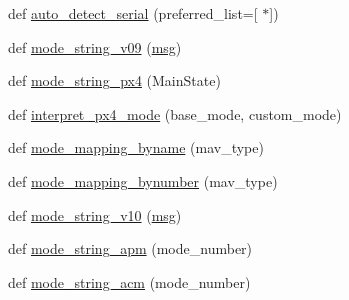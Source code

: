 \begin{DoxyCompactItemize}
\item 
def \mbox{\hyperlink{namespacepymavlink_1_1mavutil_a256e344d1870c0a938cac5b21d3003be}{auto\+\_\+detect\+\_\+serial}} (preferred\+\_\+list=\mbox{[}\textquotesingle{} $\ast$\textquotesingle{}\mbox{]})
\item 
def \mbox{\hyperlink{namespacepymavlink_1_1mavutil_a783db06982d9f522333a924ab479771b}{mode\+\_\+string\+\_\+v09}} (\mbox{\hyperlink{stratnode_8cpp_a82cfe4ed9bc9e1b07c8bf209c324d85b}{msg}})
\item 
def \mbox{\hyperlink{namespacepymavlink_1_1mavutil_af5358f89a8c0b59e034e262e8955e2c8}{mode\+\_\+string\+\_\+px4}} (Main\+State)
\item 
def \mbox{\hyperlink{namespacepymavlink_1_1mavutil_af62b6a5d02a3c22bf1ee7913d8679939}{interpret\+\_\+px4\+\_\+mode}} (base\+\_\+mode, custom\+\_\+mode)
\item 
def \mbox{\hyperlink{namespacepymavlink_1_1mavutil_adcc2e66e515b28aa81dd57269146f732}{mode\+\_\+mapping\+\_\+byname}} (mav\+\_\+type)
\item 
def \mbox{\hyperlink{namespacepymavlink_1_1mavutil_a5cbe38343057f0223a146df80d3f23a8}{mode\+\_\+mapping\+\_\+bynumber}} (mav\+\_\+type)
\item 
def \mbox{\hyperlink{namespacepymavlink_1_1mavutil_abd1b0e50cf94d71860435e54d37ce462}{mode\+\_\+string\+\_\+v10}} (\mbox{\hyperlink{stratnode_8cpp_a82cfe4ed9bc9e1b07c8bf209c324d85b}{msg}})
\item 
def \mbox{\hyperlink{namespacepymavlink_1_1mavutil_ae82875e1b8c41c234785cfe99012fa3d}{mode\+\_\+string\+\_\+apm}} (mode\+\_\+number)
\item 
def \mbox{\hyperlink{namespacepymavlink_1_1mavutil_a354ee02d2aa8af5107fc1537f58294dc}{mode\+\_\+string\+\_\+acm}} (mode\+\_\+number)
\end{DoxyCompactItemize}
